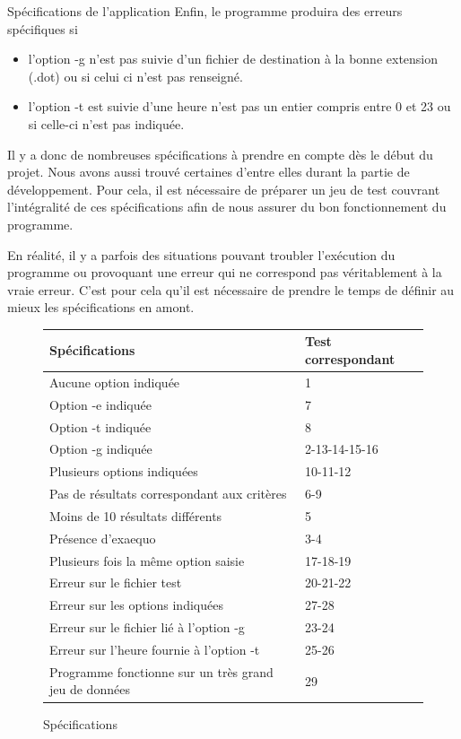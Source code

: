 \documentclass[11pt]{article}
\begin{document}
\begin{section}{Spécifications de l'application}
Enfin, le programme produira des erreurs spécifiques si 
\begin{itemize}
\item l'option -g n'est pas suivie d'un fichier de destination à la bonne extension (.dot) ou si celui ci n'est pas renseigné.
\item l'option -t est suivie d'une heure n'est pas un entier compris entre 0 et 23 ou si celle-ci n'est pas indiquée.
\newline
\end{itemize} 



Il y a donc de nombreuses spécifications à prendre en compte dès le début du projet. Nous avons aussi trouvé certaines d'entre elles durant la partie de développement. Pour cela, il est nécessaire de préparer un jeu de test couvrant l'intégralité de ces spécifications afin de nous assurer du bon fonctionnement du programme.

En réalité, il y a parfois des situations pouvant troubler l'exécution du programme ou provoquant une erreur qui ne correspond pas véritablement à la vraie erreur. C'est pour cela qu'il est nécessaire de prendre le temps de définir au mieux les spécifications en amont.

\renewcommand{\arraystretch}{1.4} 
\begin{figure}[h]
\begin{center}
\begin{tabular}{ | p{11cm} | p{4cm} |}
\hline
\bf Spécifications & \bf Test correspondant \\

\hline
Aucune option indiquée & 1 \\
\hline
Option -e indiquée & 7 \\
\hline
Option -t indiquée & 8 \\
\hline
Option -g indiquée & 2-13-14-15-16 \\
\hline
Plusieurs options indiquées & 10-11-12 \\
\hline
Pas de résultats correspondant aux critères & 6-9 \\
\hline
Moins de 10 résultats différents & 5\\
\hline
Présence d'exaequo & 3-4 \\
\hline
Plusieurs fois la même option saisie & 17-18-19 \\
\hline
Erreur sur le fichier test & 20-21-22 \\
\hline
Erreur sur les options indiquées & 27-28 \\
\hline
Erreur sur le fichier lié à l'option -g & 23-24 \\
\hline
Erreur sur l'heure fournie à l'option -t & 25-26 \\
\hline
Programme fonctionne sur un très grand jeu de données & 29 \\
\hline
\end{tabular}
\end{center}
\caption{Spécifications}
\label{Spécifications}
\end{figure}
\end{section}
\end{document}
